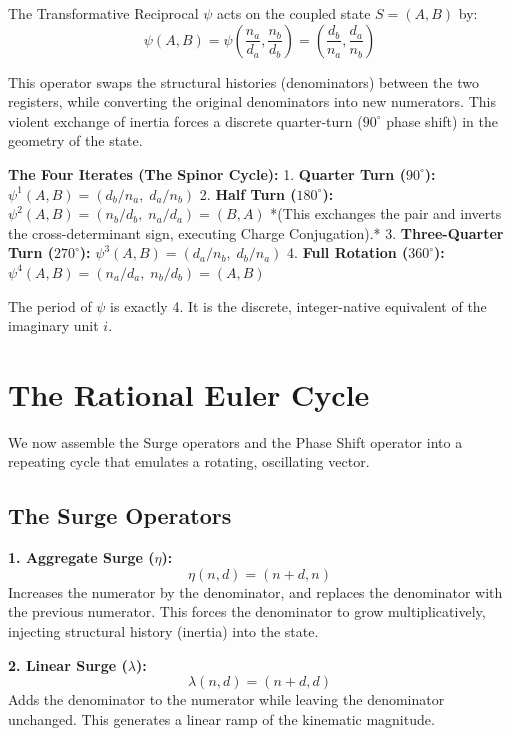 \documentclass[11pt, letterpaper]{article}
\newcommand{\aop}{\eta}
\newcommand{\lop}{\lambda}
\newcommand{\psiop}{\psi}
\begin{document}
\begin{theorem}[$\psiop$ as the Discrete Phase Shift]\label{thm:psi_rotation}
\begin{rsbox}
The Transformative Reciprocal $\psiop$ acts on the coupled state $S = (A, B)$ by:
\[ \psiop(A, B) = \psiop\left(\frac{n_a}{d_a}, \frac{n_b}{d_b}\right) = \left(\frac{d_b}{n_a}, \frac{d_a}{n_b}\right) \]

This operator swaps the structural histories (denominators) between the two registers, while converting the original denominators into new numerators. This violent exchange of inertia forces a discrete quarter-turn ($90^\circ$ phase shift) in the geometry of the state.

\textbf{The Four Iterates (The Spinor Cycle):}
1. \textbf{Quarter Turn ($90^\circ$):} $\psiop^1(A, B) = (d_b/n_a,\; d_a/n_b)$
2. \textbf{Half Turn ($180^\circ$):} $\psiop^2(A, B) = (n_b/d_b,\; n_a/d_a) = (B, A)$
   *(This exchanges the pair and inverts the cross-determinant sign, executing Charge Conjugation).*
3. \textbf{Three-Quarter Turn ($270^\circ$):} $\psiop^3(A, B) = (d_a/n_b,\; d_b/n_a)$
4. \textbf{Full Rotation ($360^\circ$):} $\psiop^4(A, B) = (n_a/d_a,\; n_b/d_b) = (A, B)$

The period of $\psiop$ is exactly 4. It is the discrete, integer-native equivalent of the imaginary unit $i$.
\end{rsbox}
\end{theorem}

\section{The Rational Euler Cycle}

We now assemble the Surge operators and the Phase Shift operator into a repeating cycle that emulates a rotating, oscillating vector.

\subsection{The Surge Operators}

\begin{rsbox}
\textbf{1. Aggregate Surge ($\aop$):}
\[ \aop(n, d) = (n + d, n) \]
Increases the numerator by the denominator, and replaces the denominator with the previous numerator. This forces the denominator to grow multiplicatively, injecting structural history (inertia) into the state.

\textbf{2. Linear Surge ($\lop$):}
\[ \lop(n, d) = (n + d, d) \]
Adds the denominator to the numerator while leaving the denominator unchanged. This generates a linear ramp of the kinematic magnitude.
\end{rsbox}
\end{document}
